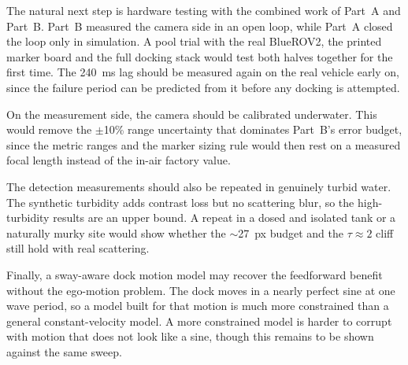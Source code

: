 The natural next step is hardware testing with the combined work of Part~A and Part~B. Part~B measured the camera side in an open loop, while Part~A closed the loop only in simulation. A pool trial with the real BlueROV2, the printed marker board and the full docking stack would test both halves together for the first time. The 240~ms lag should be measured again on the real vehicle early on, since the failure period can be predicted from it before any docking is attempted.

On the measurement side, the camera should be calibrated underwater. This would remove the $\pm$10\% range uncertainty that dominates Part~B's error budget, since the metric ranges and the marker sizing rule would then rest on a measured focal length instead of the in-air factory value.

The detection measurements should also be repeated in genuinely turbid water. The synthetic turbidity adds contrast loss but no scattering blur, so the high-turbidity results are an upper bound. A repeat in a dosed and isolated tank or a naturally murky site would show whether the $\sim$27~px budget and the $\tau \approx 2$ cliff still hold with real scattering.

Finally, a sway-aware dock motion model may recover the feedforward benefit without the ego-motion problem. The dock moves in a nearly perfect sine at one wave period, so a model built for that motion is much more constrained than a general constant-velocity model. A more constrained model is harder to corrupt with motion that does not look like a sine, though this remains to be shown against the same sweep.
